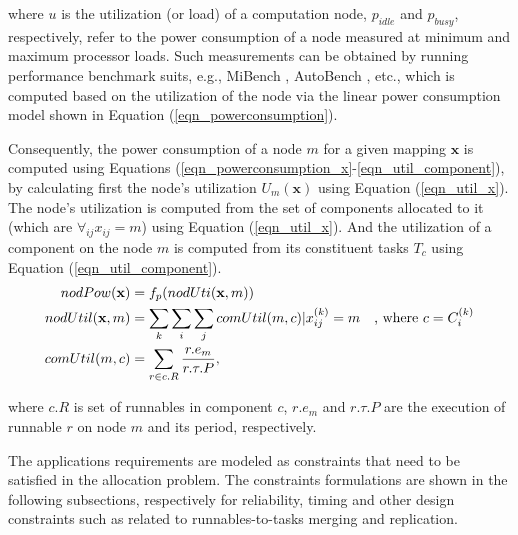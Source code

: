 where $u$ is the utilization (or load) of a computation node, $p_{idle}$ and $p_{busy}$, respectively, refer to the power consumption of a node measured at minimum and maximum processor loads. Such measurements can be obtained by running performance benchmark suits, e.g., MiBench \cite{Guthaus2001MiBench:Suite}, AutoBench \cite{EMBC2018AutoBenchProcessors}, etc., which is computed based on the utilization of the node via the linear power consumption model shown in Equation (\ref{eqn_powerconsumption}).

Consequently, the power consumption of a node $m$ for a given mapping $\textbf{x}$ is computed using Equations (\ref{eqn_powerconsumption_x}-\ref{eqn_util_component}), by calculating first the node's utilization $U_m(\textbf{x})$ using Equation (\ref{eqn_util_x}). The node's utilization is computed from the set of components allocated to it (which are $\forall_{ij} x_{ij}=m$) using Equation (\ref{eqn_util_x}). And the utilization of a component on the node $m$ is computed from its constituent tasks $T_c$ using Equation (\ref{eqn_util_component}).
\begin{align}
	\label{eqn_powerconsumption_x}
nodPow(\textbf{x}) & =f_p(nodUti(\textbf{x},m))                         &  \\
	\label{eqn_util_x}
nodUtil(\textbf{x},m)           & = \sum_{k}{\sum_{i}{\sum_{j}{comUtil(m,c)}}}|\xkij=m         & \text{, where } c=\sss{C}\\
	\label{eqn_util_component}
comUtil(m,c)              & = \sum_{r\in c.R} \frac{r.e_m}{r.\tau.P}, &
\end{align}

where $c.R$ is set of runnables in component $c$, $r.e_m$ and $r.\tau.P$ are the execution of runnable $r$ on node $m$ and its period, respectively.

The applications requirements are modeled as constraints that need to be satisfied in the allocation problem. The constraints formulations are shown in the following subsections, respectively for reliability, timing and other design constraints such as related to runnables-to-tasks merging and replication.

